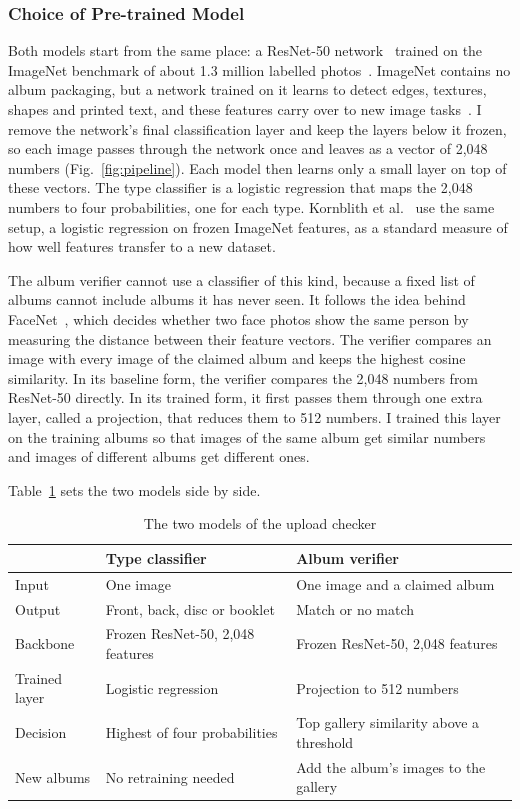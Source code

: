 \documentclass[conference]{IEEEtran}
\begin{document}
\subsubsection{Choice of Pre-trained Model}\label{sec:choice}
Both models start from the same place: a ResNet-50 network~\cite{he2016resnet} trained on the ImageNet benchmark of about 1.3 million labelled photos~\cite{deng2009imagenet}. ImageNet contains no album packaging, but a network trained on it learns to detect edges, textures, shapes and printed text, and these features carry over to new image tasks~\cite{yosinski2014transferable}. I remove the network's final classification layer and keep the layers below it frozen, so each image passes through the network once and leaves as a vector of 2,048 numbers (Fig.~\ref{fig:pipeline}). Each model then learns only a small layer on top of these vectors.
The type classifier is a logistic regression that maps the 2,048 numbers to four probabilities, one for each type. Kornblith et al.~\cite{kornblith2019better} use the same setup, a logistic regression on frozen ImageNet features, as a standard measure of how well features transfer to a new dataset.

The album verifier cannot use a classifier of this kind, because a fixed list of albums cannot include albums it has never seen. It follows the idea behind FaceNet~\cite{schroff2015facenet}, which decides whether two face photos show the same person by measuring the distance between their feature vectors. The verifier compares an image with every image of the claimed album and keeps the highest cosine similarity. In its baseline form, the verifier compares the 2,048 numbers from ResNet-50 directly. In its trained form, it first passes them through one extra layer, called a projection, that reduces them to 512 numbers. I trained this layer on the training albums so that images of the same album get similar numbers and images of different albums get different ones.

Table~\ref{tab:models} sets the two models side by side.

\begin{table}[t]
\caption{The two models of the upload checker}
\label{tab:models}
\centering
\small
\begin{tabularx}{\columnwidth}{@{}l>{\raggedright\arraybackslash}X>{\raggedright\arraybackslash}X@{}}
\toprule
 & \textbf{Type classifier} & \textbf{Album verifier} \\
\midrule
Input & One image & One image and a claimed album \\
Output & Front, back, disc or booklet & Match or no match \\
Backbone & Frozen ResNet-50, 2,048 features & Frozen ResNet-50, 2,048 features \\
Trained layer & Logistic regression & Projection to 512 numbers \\
Decision & Highest of four probabilities & Top gallery similarity above a threshold \\
New albums & No retraining needed & Add the album's images to the gallery \\
\bottomrule
\end{tabularx}
\end{table}
\end{document}
